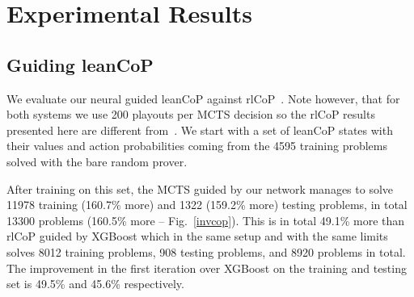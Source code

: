 \documentclass{ecai}
\def\systemname#1{\textsf{#1}\xspace}
\newcommand{\rlc}{\systemname{rlCoP}}
\newcommand{\lc}{\systemname{leanCoP}}
\newcommand{\nbc}[3]{
                {\colorbox{#3}{\bfseries\sffamily\scriptsize\textcolor{white}{#1}}}
                {\textcolor{#3}{\sffamily\small$\blacktriangleright$\textit{#2}$\blacktriangleleft$}}
}
\newcommand{\todoat}[2]{\nbc{TODO: #1}{#2}{todocolor}}
\begin{document}
%
%

\section{Experimental Results}
\label{results}
\subsection{Guiding \lc}
We evaluate our neural guided \lc against rlCoP~\cite{KaliszykUMO18}. Note however, that for both systems we
use 200 playouts per MCTS decision so the \rlc results presented here are different from~\cite{KaliszykUMO18}. We start with a set of \lc states with their values and action probabilities coming from the 4595 training 
problems 
solved with the bare random prover. 

After training on this set, the MCTS guided
by our network manages to solve 11978 training (160.7\% more) and 1322 (159.2\% more) testing problems, in total 13300 problems (160.5\% more -- Fig.~\ref{invcop}). This is
in total
49.1\%
more than \rlc guided by XGBoost  which in the same setup and with the same limits
solves 8012 training problems, 908 testing problems, and 8920 problems in total. 
The improvement in the first iteration over XGBoost on the training and testing set is 49.5\% and 45.6\% respectively.
\end{document}
